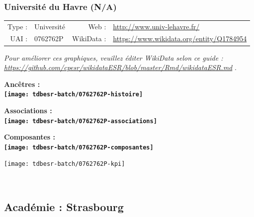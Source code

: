\documentclass[12pt,french,]{article}
\begin{document}
\ifoddpage \fi ~\newpage  

\hypertarget{universituxe9-du-havre-na}{%
\subsubsection{Université du Havre
(N/A)}\label{universituxe9-du-havre-na}}

\begin{tabular*}{\textwidth}{rp{5cm}rl}  
\hline  
Type : & Université & Web : &\href{http://www.univ-lehavre.fr/}{http://www.univ-lehavre.fr/} \\  
UAI : & 0762762P & WikiData : & \href{https://www.wikidata.org/entity/Q1784954}{https://www.wikidata.org/entity/Q1784954} \\  
\hline  
\end{tabular*}

\textit{\scriptsize Pour améliorer ces graphiques, veuillez éditer WikiData selon ce guide :  \href{https://github.com/cpesr/wikidataESR/blob/master/Rmd/wikidataESR.md}{https://github.com/cpesr/wikidataESR/blob/master/Rmd/wikidataESR.md}}
.

\vspace{1cm}  
\begin{minipage}[b]{0.50\textwidth}\begin{center} \bf Ancêtres : \\  
\texttt{[image: tdbesr-batch/0762762P-histoire]} \end{center}\end{minipage}\begin{minipage}[b]{0.50\textwidth}\begin{center} \bf Associations : \\  
\texttt{[image: tdbesr-batch/0762762P-associations]} \end{center}\end{minipage}

\hrulefill

\begin{center} \bf Composantes : \\  
\texttt{[image: tdbesr-batch/0762762P-composantes]} \end{center}

\begin{center}\texttt{[image: tdbesr-batch/0762762P-kpi]} \end{center}\checkoddpage

\ifoddpage \fi ~\newpage  

\hypertarget{acaduxe9mie-strasbourg}{%
\subsection{Académie : Strasbourg}\label{acaduxe9mie-strasbourg}}
\end{document}
